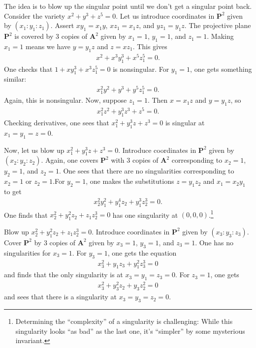 \documentclass [11 pt, oneside] {article}
\begin{document}
\begin{example}\label{}\text{}
The idea is to blow up the singular point until we don't get a singular point back. Consider the variety $x^2+y^3+z^5=0$. Let us introduce coordinates in $\mathbf{P}^2$ given by $(x_1:y_1:z_1)$. Assert $xy_1=x_1y$, $xz_1=x_1z$, and $yz_1=y_1z$. The projective plane $\mathbf{P}^2$ is covered by $3$ copies of $\mathbf{A}^2$ given by $x_1=1$, $y_1=1$, and $z_1=1$. Making $x_1=1$ means we have $y=y_1z$ and $z=xz_1$. This gives 
\begin{align*}
	x^2+x^3y_1^3+x^5z_1^5=0.
\end{align*}
One checks that $1+xy_1^3 + x^3z_1^5=0$ is nonsingular. For $y_1=1$, one gets something similar:
\begin{align*}
	x_1^2y^2 + y^3 +y^5z_1^5=0.
\end{align*}
Again, this is nonsingular. Now, suppose $z_1=1$. Then $x=x_1z$ and $y=y_1z$, so
\begin{align*}
	x_1^2z^2 + y_1^3z^3 + z^5 =0.
\end{align*}
Checking derivatives, one sees that $x_1^2 + y_1^3z+z^3=0$ is singular at $x_1=y_1=z=0$.

Now, let us blow up $x_1^2+y_1^3z+z^3=0$. Introduce coordinates in $\mathbf{P}^2$ given by $(x_2:y_2:z_2)$. Again, one covers $\mathbf{P}^2$ with $3$ copies of $\mathbf{A}^2$ corresponding to $x_2=1$, $y_2=1$, and $z_2=1$. One sees that there are no singularities corresponding to $x_2=1$ or $z_2=1$.For $y_2=1$, one makes the substitutions $z=y_1z_2$ and $x_1=x_2y_1$ to get
\begin{align*}
	x_2^2y_1^2 + y_1^4z_2+y_1^3z_2^3=0.
\end{align*}
One finds that $x_2^2+y_1^2z_2+z_1z_2^3=0$ has one singularity at $(0,0,0)$.\footnote{Determining the ``complexity'' of a singularity is challenging: While this singularity looks ``as bad'' as the last one, it's ``simpler'' by some mysterious invariant.}

Blow up $x_2^2+y_1^2z_2+z_1z_2^3=0$. Introduce coordinates in $\mathbf{P}^2$ given by $(x_3:y_3:z_3)$. Cover $\mathbf{P}^2$ by $3$ copies of $\mathbf{A}^2$ given by $x_3=1$, $y_3=1$, and $z_3=1$. One has no singularities for $x_3=1$. For $y_3=1$, one gets the equation 
\begin{align*}
	x_3^2+y_1z_3+y_1^2z_3^3 =0
\end{align*}
and finds that the only singularity is at $x_3=y_1=z_3=0$. For $z_3=1$, one gets
\begin{align*}
	x_3^2+y_3^2z_2+y_3z_2^2 =0
\end{align*}
and sees that there is a singularity at $x_3=y_3=z_2=0$.


\end{example}
\end{document}
